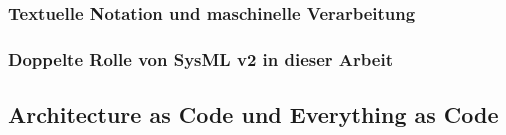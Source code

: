 \subsubsection{Textuelle Notation und maschinelle Verarbeitung}
\label{sec:sysml_v2_textual}

%
%
%
%
%
%
%
%


\subsubsection{Doppelte Rolle von SysML v2 in dieser Arbeit}
\label{sec:sysml_double_role_foundation}

%
%
%
%
%
%
%
%
%


\subsection{Architecture as Code und Everything as Code}
\label{sec:architecture_as_code}

